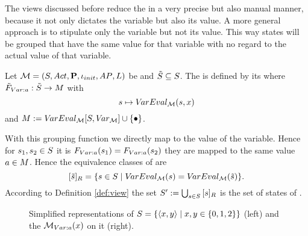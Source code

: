 \documentclass[preview]{standalone}
\begin{document}
The views discussed before reduce the \chgphN in a very precise but also manual manner, because it not only dictates the variable but also its value. A more general approach is to stipulate only the variable but not its value. This way states will be grouped that have the same value for that variable with no regard to the actual value of that variable. 

\begin{definition}
	Let ${{{\mathcal{M}}}} = {{({S}, {Act}, {\textbf{P}}, {\iota_{init}}, {AP}, {L})}}$ be \achgphN and ${\tilde{{S}}} \subseteq {S}$. The \viewN \viewparamvalident is defined by its \grpfctN \gfctparamvalident where ${{\tilde{F}_{{Var:{a}}}}} : {\tilde{{S}}} \to {\ensuremath{{M}}}$ with
	\[
	{s} \mapsto {V\!arEval_{\ensuremath{{{\mathcal{M}}}}}}({s},{x})
	\]
	and ${{M}} := {{V\!arEval_{{{\mathcal{M}}}}}[{S},{V\!ar_{{{\mathcal{M}}}}}]} \cup \{{\bullet}\}$.
\end{definition}

With this grouping function we directly map to the value of the variable. Hence for ${s}_1, {s}_2 \in {S}$ it is ${{F_{{Var:{a}}}}}({s}_1) = {{F_{{Var:{a}}}}}({s}_2)$ \iffN they are mapped to the same value ${a} \in {\ensuremath{{M}}}$. Hence the equivalence classes of \eqrelview are
\[
{{[{\tilde{{s}}}]_{{R}}}} = \{ {s} \in {S} \mid {V\!arEval_{\ensuremath{{{\mathcal{M}}}}}}({s}) = {V\!arEval_{{{\mathcal{M}}}}}({\tilde{{s}}})\}.
\]
According to Definition \ref{def:view} the set ${S}' := \bigcup_{{s} \in {S}} {{[{s}]_{{R}}}}$ is the set of states of \viewparamvalident.

\begin{figure}[h]
	\begin{minipage}{.6\textwidth}
		
	\end{minipage}%
	\begin{minipage}{.5\textwidth}
		
	\end{minipage}
	\caption{Simplified representations of \mdp ${S} = \{{\langle x,y\rangle} \mid x,y \in \{0, 1, 2\}\}$ (left) and the \viewN ${{{{{\mathcal{M}}}}_{{Var:{a}}}}}(x)$ on it (right).}
	\label{fig:varValIdent}  
\end{figure}
\end{document}

